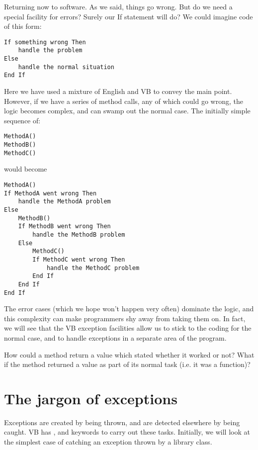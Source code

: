 		Returning now to software. As we said, things go wrong. But do we need a special facility for errors? Surely our If statement will do? We could imagine code of this form:
		\begin{lstlisting}
If something wrong Then
	handle the problem
Else
	handle the normal situation
End If
		\end{lstlisting}
		Here we have used a mixture of English and VB to convey the main point. However, if we have a series of method calls, any of which could go wrong, the logic becomes complex, and can swamp out the normal case. The initially simple sequence of:
		\begin{lstlisting}
MethodA()
MethodB()
MethodC()
		\end{lstlisting}
		would become
		\begin{lstlisting}
MethodA()
If MethodA went wrong Then
	handle the MethodA problem
Else
	MethodB()
	If MethodB went wrong Then
		handle the MethodB problem
	Else
		MethodC()
		If MethodC went wrong Then
			handle the MethodC problem
		End If
	End If
End If
		\end{lstlisting}
		The error cases (which we hope won't happen very often) dominate the logic, and this complexity can make programmers shy away from taking them on. In fact, we will see that the VB exception facilities allow us to stick to the coding for the normal case, and to handle exceptions in a separate area of the program.

		\begin{stqb}
			\begin{STQ}
			\item How could a method return a value which stated whether it worked or not? What if the method returned a value as part of its normal task (i.e. it was a function)?
			\end{STQ}
		\end{stqb}


	\section{The jargon of exceptions}
		Exceptions are created by being thrown, and are detected elsewhere by being caught. VB has ,  and  keywords to carry out these tasks. Initially, we will look at the simplest case of catching an exception thrown by a library class.


